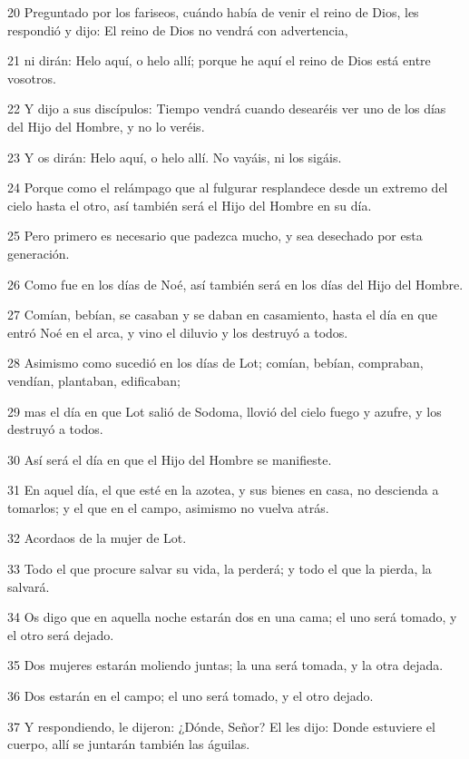 \par 20 Preguntado por los fariseos, cuándo había de venir el reino de Dios, les respondió y dijo: El reino de Dios no vendrá con advertencia,
\par 21 ni dirán: Helo aquí, o helo allí; porque he aquí el reino de Dios está entre vosotros.
\par 22 Y dijo a sus discípulos: Tiempo vendrá cuando desearéis ver uno de los días del Hijo del Hombre, y no lo veréis.
\par 23 Y os dirán: Helo aquí, o helo allí. No vayáis, ni los sigáis.
\par 24 Porque como el relámpago que al fulgurar resplandece desde un extremo del cielo hasta el otro, así también será el Hijo del Hombre en su día.
\par 25 Pero primero es necesario que padezca mucho, y sea desechado por esta generación.
\par 26 Como fue en los días de Noé, así también será en los días del Hijo del Hombre.
\par 27 Comían, bebían, se casaban y se daban en casamiento, hasta el día en que entró Noé en el arca, y vino el diluvio y los destruyó a todos.
\par 28 Asimismo como sucedió en los días de Lot; comían, bebían, compraban, vendían, plantaban, edificaban;
\par 29 mas el día en que Lot salió de Sodoma, llovió del cielo fuego y azufre, y los destruyó a todos.
\par 30 Así será el día en que el Hijo del Hombre se manifieste.
\par 31 En aquel día, el que esté en la azotea, y sus bienes en casa, no descienda a tomarlos; y el que en el campo, asimismo no vuelva atrás.
\par 32 Acordaos de la mujer de Lot.
\par 33 Todo el que procure salvar su vida, la perderá; y todo el que la pierda, la salvará.
\par 34 Os digo que en aquella noche estarán dos en una cama; el uno será tomado, y el otro será dejado.
\par 35 Dos mujeres estarán moliendo juntas; la una será tomada, y la otra dejada.
\par 36 Dos estarán en el campo; el uno será tomado, y el otro dejado.
\par 37 Y respondiendo, le dijeron: ¿Dónde, Señor? El les dijo: Donde estuviere el cuerpo, allí se juntarán también las águilas.

